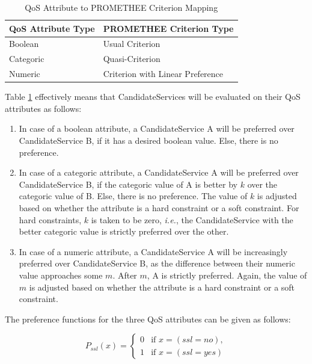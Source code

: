 \documentclass[10pt,journal,compsoc]{IEEEtran}
\begin{document}
\begin{table}
\centering
\begin{tabular}{ll}
\toprule
QoS Attribute Type & PROMETHEE Criterion Type \\
\midrule
Boolean & Usual Criterion \\
Categoric & Quasi-Criterion \\
Numeric & Criterion with Linear Preference \\
\bottomrule
\end{tabular}
\caption{QoS Attribute to PROMETHEE Criterion Mapping \label{tbl:qos_promethee_mapping}}
\end{table}

Table \ref{tbl:qos_promethee_mapping} effectively means that CandidateServices will be evaluated on their QoS attributes as follows:
	\begin{enumerate}
		\item In case of a boolean attribute, a CandidateService A will be preferred over CandidateService B, if it has a desired boolean value. Else, there is no preference.
		\item In case of a categoric attribute, a CandidateService A will be preferred over CandidateService B, if the categoric value of A is better by $k$ over the categoric value of B. Else, there is no preference. The value of $k$ is adjusted based on whether the attribute is a hard constraint or a soft constraint. For hard constraints, $k$ is taken to be zero, \textit{i.e.}, the CandidateService with the better categoric value is strictly preferred over the other. 
		\item In case of a numeric attribute, a CandidateService A will be increasingly preferred over CandidateService B, as the difference between their numeric value approaches some $m$. After $m$, A is strictly preferred. Again, the value of $m$ is adjusted based on whether the attribute is a hard constraint or a soft constraint. 
	\end{enumerate}
	
	The preference functions for the three QoS attributes can be given as follows:
	
	\begin{equation}
		P_{ssl}(x) = \begin{cases} 0 &\mbox{if } x = (ssl=no),\\ 
							1 &\mbox{if } x = (ssl=yes) \end{cases}
			\label{pref_ssl}
	\end{equation}
\end{document}
